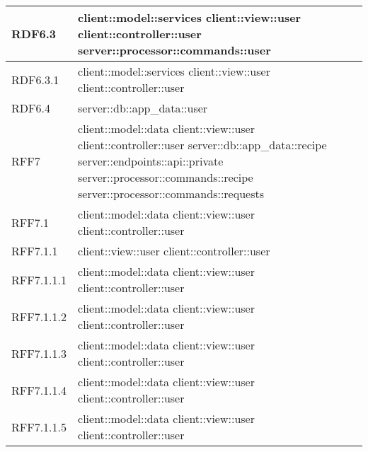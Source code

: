 \begin{center}
\begin{longtable}{| p{4cm} | p{8cm} |}
\hline
RDF6.3 & client::model::services \newline client::view::user \newline client::controller::user \newline server::processor::commands::user \\
\hline
RDF6.3.1 & client::model::services \newline client::view::user \newline client::controller::user \\
\hline
RDF6.4 & server::db::app\_data::user \\
\hline
RFF7 & client::model::data \newline client::view::user \newline client::controller::user \newline server::db::app\_data::recipe \newline server::endpoints::api::private \newline server::processor::commands::recipe \newline server::processor::commands::requests \\
\hline
RFF7.1 & client::model::data \newline client::view::user \newline client::controller::user \\
\hline
RFF7.1.1 & client::view::user \newline client::controller::user \\
\hline
RFF7.1.1.1 & client::model::data \newline client::view::user \newline client::controller::user \\
\hline
RFF7.1.1.2 & client::model::data \newline client::view::user \newline client::controller::user \\
\hline
RFF7.1.1.3 & client::model::data \newline client::view::user \newline client::controller::user \\
\hline
RFF7.1.1.4 & client::model::data \newline client::view::user \newline client::controller::user \\
\hline
RFF7.1.1.5 & client::model::data \newline client::view::user \newline client::controller::user \\

\end{longtable}
\end{center}
